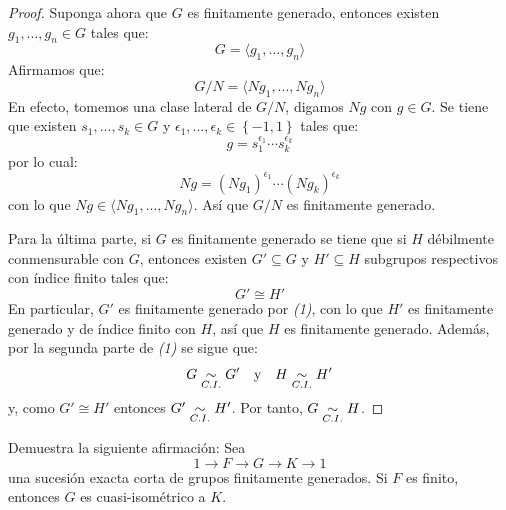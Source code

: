 \documentclass[12pt]{report}
\newcounter{it}
\theoremstyle{largebreak}
\newcommand{\gen}[1]{\ensuremath{\langle#1\rangle}}
\begin{document}
\begin{proof}
        Suponga ahora que $G$ es finitamente generado, entonces existen $g_1,...,g_n\in G$ tales que:
        \begin{equation*}
            G=\gen{g_1,...,g_n}
        \end{equation*}
        Afirmamos que:
        \begin{equation*}
            G/N=\gen{Ng_1,...,Ng_n }
        \end{equation*}
        En efecto, tomemos una clase lateral de $G/N$, digamos $Ng$ con $g\in G$. Se tiene que existen $s_1,...,s_k\in G$ y $\epsilon_1,...,\epsilon_k\in\left\{-1,1\right\}$ tales que:
        \begin{equation*}
            g=s_1^{\epsilon_1}\cdots s_k^{\epsilon_k}
        \end{equation*}
        por lo cual:
        \begin{equation*}
            Ng=(Ng_1)^{\epsilon_1}\cdots (Ng_k)^{\epsilon_k}
        \end{equation*}
        con lo que $Ng\in\gen{Ng_1,...,Ng_n }$. Así que $G/N$ es finitamente generado.

        Para la última parte, si $G$ es finitamente generado se tiene que si $H$ débilmente conmensurable con $G$, entonces existen $G'\subseteq G$ y $H'\subseteq H$ subgrupos respectivos con índice finito tales que:
        \begin{equation*}
            G'\cong H'
        \end{equation*}
        En particular, $G'$ es finitamente generado por \textit{(1)}, con lo que $H'$ es finitamente generado y de índice finito con $H$, así que $H$ es finitamente generado. Además, por la segunda parte de \textit{(1)} se sigue que:
        \begin{equation*}
            G\underset{C.I.}{\sim} G'\quad\textup{y}\quad H\underset{C.I.}{\sim} H'
        \end{equation*}
        y, como $G'\cong H'$ entonces $G'\underset{C.I.}{\sim} H'$. Por tanto, $G\underset{C.I.}{\sim} H$.
    \end{proof}

    \begin{excer}
        Demuestra la siguiente afirmación: Sea
        \begin{equation*}
            1\rightarrow F\rightarrow G\rightarrow K\rightarrow1
        \end{equation*}
        una sucesión exacta corta de grupos finitamente generados. Si $F$ es finito, entonces $G$ es cuasi-isométrico a $K$.
    \end{excer}
\end{document}
